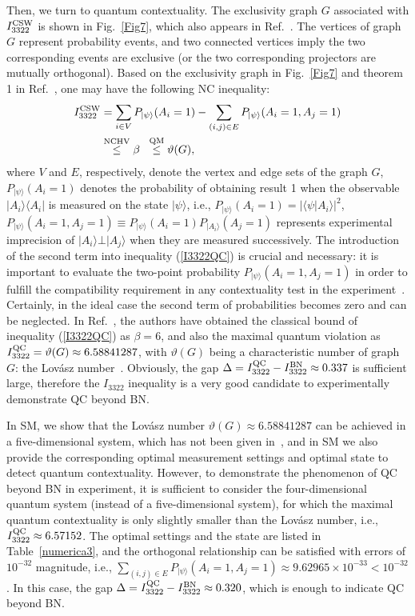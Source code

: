 \documentclass[prl,letterpaper,english,reprint,nofootinbib,aps,superscriptaddress,showpacs,showkeys]{revtex4-1}
\theoremstyle{definition}
\theoremstyle{remark}
\begin{document}
Then, we turn to quantum contextuality. The exclusivity graph $G$ associated with $I_{3322}^{\rm CSW}$ is shown in Fig.~\ref{Fig7}, which also appears in Ref.~\cite{RDLTC14}.
The vertices of graph $G$ represent probability events, and two connected vertices imply the two corresponding events are exclusive (or the two corresponding projectors are mutually orthogonal). Based on the exclusivity graph in Fig.~\ref{Fig7} and theorem 1 in Ref.~\cite{cabello16}, one may have the following NC inequality:
\begin{align}
I_{3322}^{\rm CSW}
&=\sum_{i\in V}P_{|\psi\rangle}(A_i=1)-\sum_{(i,j)\in E}P_{|\psi\rangle}(A_i=1,A_j=1)\nonumber\\
&\overset{{\rm{NCHV}}}\leq \beta \;\;\overset{{\rm{QM}}}\leq \vartheta(G),
\label{I3322QC}
\end{align}
where $V$ and $E$, respectively, denote the vertex and edge sets of the graph $G$,
$P_{|\psi\rangle}(A_i=1)$ denotes the probability of obtaining result 1 when the observable $|A_i\rangle\langle A_i|$ is measured on the state $|\psi\rangle $,  i.e., $P_{|\psi\rangle}(A_i=1)= |\langle \psi|A_i\rangle|^2$, $P_{|\psi\rangle}(A_i=1,A_j=1)\equiv P_{|\psi\rangle}(A_i=1)P_{|A_i\rangle}(A_j=1)$ represents experimental imprecision of $|A_i\rangle\bot |A_j\rangle$ when they are measured successively. 
The introduction of the second term into inequality (\ref{I3322QC}) is crucial and necessary: it is important to evaluate the two-point probability $P_{|\psi\rangle}(A_i=1,A_j=1)$ in order to fulfill the compatibility requirement in any contextuality test in the experiment~\cite{cabello16}. Certainly, in the ideal case the second term of probabilities becomes zero and can be neglected. In Ref.~\cite{RDLTC14}, the authors have obtained the classical bound of inequality (\ref{I3322QC}) as $\beta=6$, and also the maximal quantum violation as $I_{3322}^{\rm QC}=\vartheta(G)\approx 6.58841287$, with $\vartheta(G)$ being a characteristic number of graph $G$: the Lov\'asz number~\cite{Lovasz}. Obviously, the gap $\Delta=I_{3322}^{\rm QC}-I_{3322}^{\rm BN}\approx 0.337$ is sufficient large, therefore the $I_{3322}$
inequality is a very good candidate to experimentally demonstrate QC beyond BN.

In SM, we show that the Lov\'asz number $\vartheta(G)\approx 6.58841287$ can be achieved in a five-dimensional system, which has not been given in~\cite{RDLTC14}, and in SM we also provide the corresponding optimal measurement settings and optimal state to detect quantum contextuality. However, to demonstrate the phenomenon of QC beyond BN in experiment, it is sufficient to consider the four-dimensional quantum system (instead of a five-dimensional system), for which the maximal quantum contextuality is only slightly smaller than the Lov\'asz number, i.e., $I_{3322}^{\rm QC}\approx6.57152$. The optimal settings and the state are listed in Table~\ref{numerica3}, and the orthogonal relationship can be satisfied with errors of $10^{-32}$ magnitude, i.e., $\sum_{(i,j)\in E}P_{|\psi\rangle}(A_i=1,A_j=1)\approx 9.62965\times 10^{-33}<10^{-32}$. In this case, the gap $\Delta=I_{3322}^{\rm QC}-I_{3322}^{\rm BN}\approx 0.320$, which is enough to indicate QC beyond BN.
\end{document}
